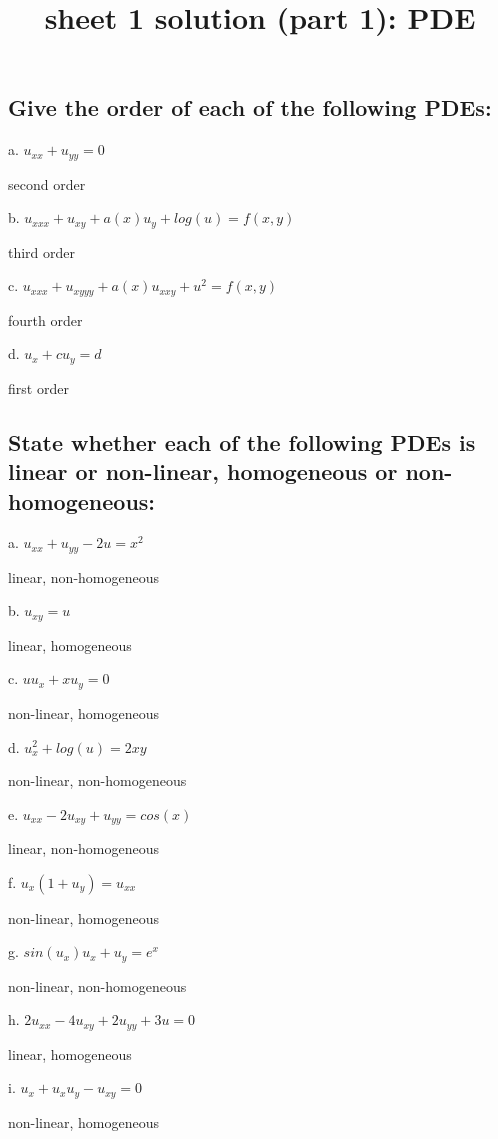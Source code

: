 \documentclass[12 pt]{article}
\title{\huge{sheet 1 solution (part 1): PDE}}
\author{}
\date{}
\begin{document}
\maketitle
\subsection*{Give the order of each of the following PDEs:}

a. $u_{xx}+u_{yy}=0$
\begin{tcolorbox}
second order
\end{tcolorbox}
b. $u_{xxx}+u_{xy}+a(x)u_y+log(u)=f(x,y)$
\begin{tcolorbox}
third order
\end{tcolorbox}
c. $u_{xxx}+u_{xyyy}+a(x)u_{xxy}+u^2=f(x,y)$
\begin{tcolorbox}
fourth order
\end{tcolorbox}
d. $u_{x}+cu_{y}=d$
\begin{tcolorbox}
first order
\end{tcolorbox}
\subsection*{State whether each of the following PDEs is linear or non-linear, homogeneous or
non-homogeneous:}

a. $u_{xx}+u_{yy}-2u=x^2$
\begin{tcolorbox}
linear, non-homogeneous
\end{tcolorbox}
b. $u_{xy}=u$
\begin{tcolorbox}
linear, homogeneous
\end{tcolorbox}
c. $uu_x +xu_y=0$
\begin{tcolorbox}
non-linear, homogeneous
\end{tcolorbox}
d. $u^{2}_x +log(u)=2xy$
\begin{tcolorbox}
non-linear, non-homogeneous
\end{tcolorbox}
e. $u_{xx}-2u_{xy}+u_{yy}=cos(x)$
\begin{tcolorbox}
linear, non-homogeneous
\end{tcolorbox}
f. $u_x(1+u_y)=u_{xx}$
\begin{tcolorbox}
non-linear, homogeneous
\end{tcolorbox}
g. $sin(u_x)u_x+u_y=e^x$
\begin{tcolorbox}
non-linear, non-homogeneous
\end{tcolorbox}
h. $2u_{xx}-4u_{xy}+2u_{yy}+3u=0$
\begin{tcolorbox}
linear, homogeneous
\end{tcolorbox}
i. $u_x +u_xu_y-u_{xy}=0$
\begin{tcolorbox}
non-linear, homogeneous
\end{tcolorbox}
\end{document}
